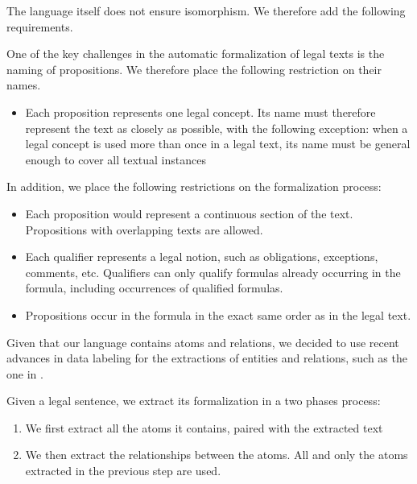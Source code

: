 The language itself does not ensure isomorphism. We therefore add the following requirements.

\begin{definition}
One of the key challenges in the automatic formalization of legal texts is the naming of propositions. We therefore place the following restriction on their names.
\begin{itemize}
\item Each proposition represents one legal concept. Its name must therefore represent the text as closely as possible, with the following exception: when a legal concept is used more than once in a legal text, its name must be general enough to cover all textual instances
\end{itemize}
In addition, we place the following restrictions on the formalization process:
\begin{itemize}
    \item Each proposition would represent a continuous section of the text. Propositions with overlapping texts are allowed.
    \item Each qualifier represents a legal notion, such as obligations, exceptions, comments, etc. Qualifiers can only qualify formulas already occurring in the formula, including occurrences of qualified formulas.
    \item Propositions occur in the formula in the exact same order as in the legal text.
\end{itemize}
\end{definition}

Given that our language contains atoms and relations, we decided to use recent advances in data labeling for the extractions of entities and relations, such as the one in \cite{gutierrez2024hipporag}.

\begin{definition}
    Given a legal sentence, we extract its formalization in a two phases process:
    \begin{enumerate}
        \item We first extract all the atoms it contains, paired with the extracted text
        \item We then extract the relationships between the atoms. All and only the atoms extracted in the previous step are used.
    \end{enumerate}
\end{definition}

